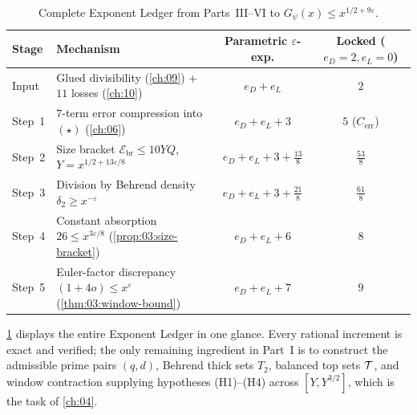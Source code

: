 \begin{table}[ht]
\centering
\caption{Complete Exponent Ledger from Parts~III--VI to $G_\psi(x) \le x^{1/2 + 9\varepsilon}$.}
\label{tab:03:exponent-ledger}
\renewcommand{\arraystretch}{1.15}
\small
\begin{tabular}{@{}llcc@{}}
\toprule
\textbf{Stage} & \textbf{Mechanism} & \textbf{Parametric $\varepsilon$-exp.} & \textbf{Locked ($e_D{=}2, e_L{=}0$)} \\
\midrule
Input & Glued divisibility (\cref{ch:09}) + $11$ losses (\cref{ch:10}) & $e_D + e_L$ & $2$ \\
Step~1 & $7$-term error compression into $(\star)$ (\cref{ch:06}) & $e_D + e_L + 3$ & $5$ ($C_{\mathrm{err}}$) \\
Step~2 & Size bracket $\mathcal{E}_{\mathrm{br}} \le 10 Y Q$, $Y = x^{1/2+13\varepsilon/8}$ & $e_D + e_L + 3 + \frac{13}{8}$ & $\frac{53}{8}$ \\
Step~3 & Division by Behrend density $\delta_2 \ge x^{-\varepsilon}$ & $e_D + e_L + 3 + \frac{21}{8}$ & $\frac{61}{8}$ \\
Step~4 & Constant absorption $26 \le x^{3\varepsilon/8}$ (\cref{prop:03:size-bracket}) & $e_D + e_L + 6$ & $8$ \\
Step~5 & Euler-factor discrepancy $(1+4o) \le x^\varepsilon$ (\cref{thm:03:window-bound}) & $e_D + e_L + 7$ & $9$ \\
\bottomrule
\end{tabular}
\end{table}

\cref{tab:03:exponent-ledger} displays the entire Exponent Ledger in one glance. Every rational increment is exact and verified; the only remaining ingredient in Part~I is to construct the admissible prime pairs $(q, d)$, Behrend thick sets $T_2$, balanced top sets $\mathcal{T}$, and window contraction supplying hypotheses (H1)--(H4) across $[Y, Y^{3/2}]$, which is the task of \cref{ch:04}.
